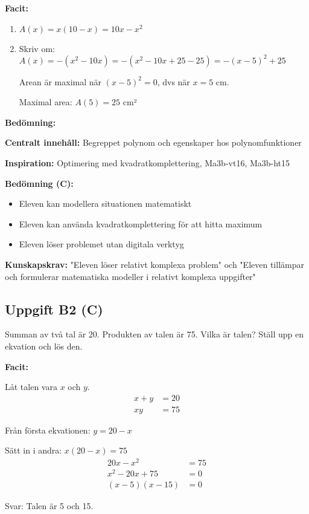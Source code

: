 \documentclass[12pt]{article}
\begin{document}
\begin{facitbox}
\textbf{Facit:}

\begin{enumerate}[label=\alph*)]
    \item $A(x) = x(10 - x) = 10x - x^2$
    \item Skriv om: $A(x) = -(x^2 - 10x) = -(x^2 - 10x + 25 - 25) = -(x - 5)^2 + 25$
    
    Arean är maximal när $(x - 5)^2 = 0$, dvs när $x = 5$ cm.
    
    Maximal area: $A(5) = 25$ cm²
\end{enumerate}
\end{facitbox}

\begin{refbox}
\textbf{Bedömning:}

\textbf{Centralt innehåll:} Begreppet polynom och egenskaper hos polynomfunktioner

\textbf{Inspiration:} Optimering med kvadratkomplettering, Ma3b-vt16, Ma3b-ht15

\textbf{Bedömning (C):}
\begin{itemize}
    \item Eleven kan modellera situationen matematiskt
    \item Eleven kan använda kvadratkomplettering för att hitta maximum
    \item Eleven löser problemet utan digitala verktyg
\end{itemize}

\textbf{Kunskapskrav:} "Eleven löser relativt komplexa problem" och "Eleven tillämpar och formulerar matematiska modeller i relativt komplexa uppgifter"
\end{refbox}

\subsection*{Uppgift B2 (C)}
Summan av två tal är 20. Produkten av talen är 75. Vilka är talen? Ställ upp en ekvation och lös den.

\begin{facitbox}
\textbf{Facit:}

Låt talen vara $x$ och $y$.
\begin{align*}
x + y &= 20 \\
xy &= 75
\end{align*}

Från första ekvationen: $y = 20 - x$

Sätt in i andra: $x(20 - x) = 75$
\begin{align*}
20x - x^2 &= 75 \\
x^2 - 20x + 75 &= 0 \\
(x - 5)(x - 15) &= 0
\end{align*}

Svar: Talen är 5 och 15.
\end{facitbox}
\end{document}
